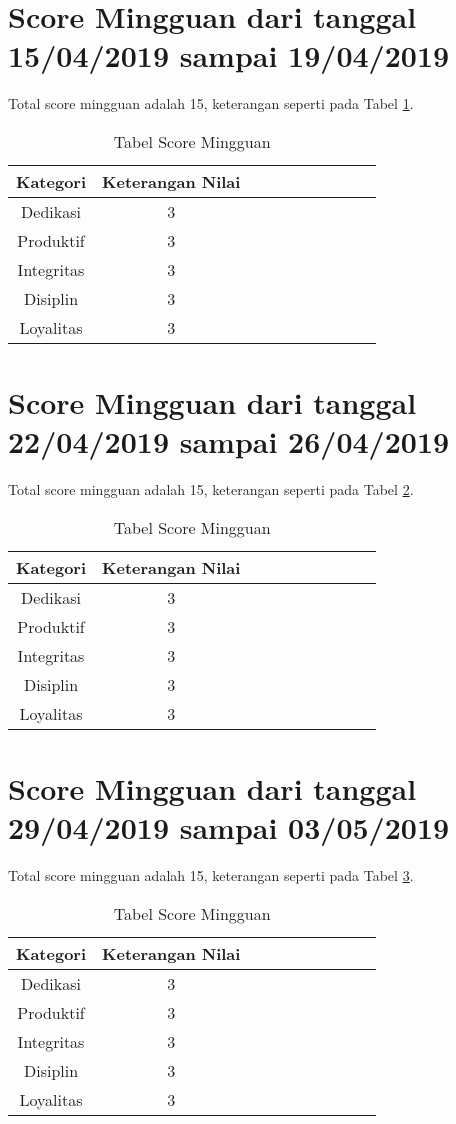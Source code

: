 \section{Score Mingguan dari tanggal 15/04/2019 sampai 19/04/2019}
Total score mingguan adalah 15,  keterangan seperti pada Tabel \ref{table:scoremingguan8}.
\begin{table}[!ht]
\centering
\begin{tabular}{ |c|c|c|c|c|c|c|c|c|c| }
\hline
Kategori & Keterangan Nilai \\
\hline
Dedikasi & 3 \\
\hline
Produktif & 3 \\
\hline
Integritas & 3 \\
\hline
Disiplin & 3 \\
\hline
Loyalitas & 3 \\
\hline
\end{tabular}
\caption{Tabel Score Mingguan}
\label{table:scoremingguan8}
\end{table}


\section{Score Mingguan dari tanggal 22/04/2019 sampai 26/04/2019}
Total score mingguan adalah 15,  keterangan seperti pada Tabel \ref{table:scoremingguan9}.
\begin{table}[!ht]
\centering
\begin{tabular}{ |c|c|c|c|c|c|c|c|c|c| }
\hline
Kategori & Keterangan Nilai \\
\hline
Dedikasi & 3 \\
\hline
Produktif & 3 \\
\hline
Integritas & 3 \\
\hline
Disiplin & 3 \\
\hline
Loyalitas & 3 \\
\hline
\end{tabular}
\caption{Tabel Score Mingguan}
\label{table:scoremingguan9}
\end{table}




\section{Score Mingguan dari tanggal 29/04/2019 sampai 03/05/2019}
Total score mingguan adalah 15,  keterangan seperti pada Tabel \ref{table:scoremingguan10}.
\begin{table}[!ht]
\centering
\begin{tabular}{ |c|c|c|c|c|c|c|c|c|c| }
\hline
Kategori & Keterangan Nilai \\
\hline
Dedikasi & 3 \\
\hline
Produktif & 3 \\
\hline
Integritas & 3 \\
\hline
Disiplin & 3 \\
\hline
Loyalitas & 3 \\
\hline
\end{tabular}
\caption{Tabel Score Mingguan}
\label{table:scoremingguan10}
\end{table}